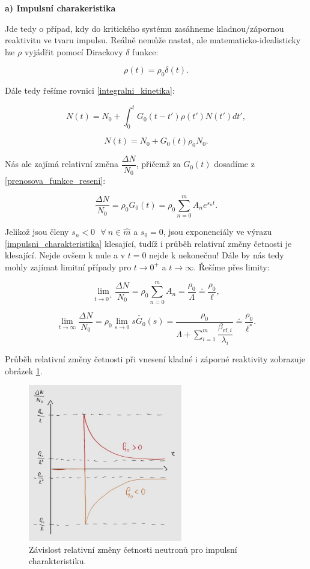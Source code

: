 \textbf{a) Impulsní charakeristika}

Jde tedy o případ, kdy do kritického systému zasáhneme kladnou/zápornou reaktivitu ve tvaru impulsu. Reálně nemůže nastat, ale matematicko-idealisticky lze $\rho$ vyjádřit pomocí Dirackovy $\delta$ funkce:

$$ \rho(t) = \rho_0 \delta (t). $$

Dále tedy řešíme rovnici \eqref{integralni_kinetika}:

$$ N(t) = N_0 + \int_0^t G_0(t-t') \rho(t') N(t')dt', $$

$$ N(t) = N_0 + G_0(t) \rho_0 N_0. $$

Nás ale zajímá relativní změna $\dfrac{\Delta N}{N_0}$, přičemž za $G_0(t)$ dosadíme z \eqref{prenosova_funkce_reseni}:

\begin{equation}
  \boxed{
  \dfrac{\Delta N}{N_0} = \rho_0 G_0 (t) = \rho_0 \sum_{n=0}^m A_n e^{s_n t}.
  \label{impulsni_charakteristika}}
\end{equation}

Jelikož jsou členy $s_n < 0 \: \: \: \forall \: n \in \widehat{m}$ a $s_0 = 0$, jsou exponenciály ve výrazu \eqref{impulsni_charakteristika} klesající, tudíž i průběh relativní změny četnosti je klesající. Nejde ovšem k nule a v $t=0$ nejde k nekonečnu! Dále by nás tedy mohly zajímat limitní případy pro $t \rightarrow 0^+$ a $t \rightarrow \infty$. Řešíme přes limity:

$$ \lim_{t \to 0^+} \dfrac{\Delta N}{N_0} = \rho_0 \sum_{n=0}^m A_n = \dfrac{\rho_0}{\Lambda} \doteq \dfrac{\rho_0}{\ell}, $$

$$ \lim_{t \to \infty} \dfrac{\Delta N}{N_0} = \rho_0 \lim_{s \rightarrow 0} s \tilde{G_0}(s) = \dfrac{\rho_0}{\Lambda + \sum_{i = 1}^m \dfrac{\beta_{\text{ef},i}}{\lambda_i}} \doteq \dfrac{\rho_0}{\ell^*}. $$

Průběh relativní změny četnosti při vnesení kladné i záporné reaktivity zobrazuje obrázek \ref{fig_impulsni}.

\begin{figure}[H]
  \centering
  \includegraphics[width=0.6\textwidth]{img/impulsni.jpg}
  \caption{Závislost relativní změny četnosti neutronů pro impulsní charakteristiku.}
  \label{fig_impulsni}
\end{figure}


